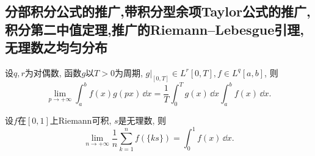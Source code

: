 \subsection{分部积分公式的推广,带积分型余项Taylor公式的推广,积分第二中值定理,推广的Riemann--Lebesgue引理,无理数之均匀分布}
\begin{theorem}\label{Th:c88}
设\(q,r\)为对偶数, 函数\(g\)以\(T>0\)为周期, \(g\big|_{[0,T]}\in L^r[0,T], f\in L^q[a,b]\), 则
\[\lim_{p\rightarrow+\infty}\int_{a}^{b}f(x)g(px)\,\dd x
=\frac{1}{T}\int_{0}^{T}g(x)\,\dd x\int_{a}^{b}f(x)\,\dd x.\]
\end{theorem}
\begin{theorem}\label{Th:wuli}
设\(f\)在\([0,1]\)上Riemann可积, \(s\)是无理数, 则
\[\lim_{n\rightarrow+\infty}\frac{1}{n}\sum_{k=1}^{n}f(\{ks\})
=\int_{0}^{1}f(x)\,\dd x.\]
\end{theorem}
